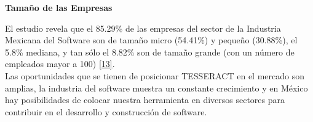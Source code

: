 \textbf{Tamaño de las Empresas}

El estudio revela que el 85.29\% de las empresas del sector de la Industria Mexicana del Software son de tamaño micro (54.41\%) y pequeño (30.88\%), el 5.8\% mediana, y tan sólo el 8.82\% son de tamaño grande (con un número de empleados mayor a 100) \hyperlink{b13}{[13]}.\\

Las oportunidades que se tienen de posicionar TESSERACT en el mercado son amplias, la industria del software muestra un constante crecimiento y en México hay posibilidades de colocar nuestra herramienta en diversos sectores para contribuir en el desarrollo y construcción de software. 